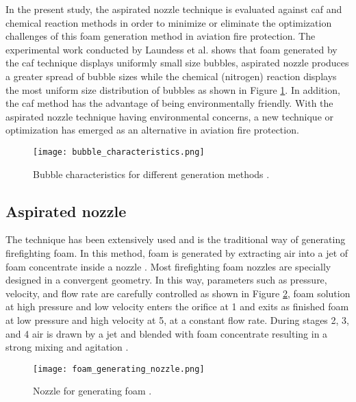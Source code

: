 In the present study, the aspirated nozzle technique is evaluated against \acrshort{caf} and chemical reaction methods in order to minimize or eliminate the optimization challenges of this foam generation method in aviation fire protection. The experimental work conducted by Laundess et al. \cite{laundess2012suppression} shows that foam generated by the \acrshort{caf} technique displays uniformly small size bubbles, aspirated nozzle produces a greater spread of bubble sizes while the chemical (nitrogen) reaction displays the most uniform size distribution of bubbles as shown in Figure \ref{ch2:figure:characteristics}. In addition, the \acrshort{caf} method has the advantage of being environmentally friendly.  With the aspirated nozzle technique having environmental concerns, a new technique or optimization has emerged as an alternative in aviation fire protection. 

\begin{figure}[H]
    \centering
    \texttt{[image: bubble\_characteristics.png]}
    \caption{Bubble characteristics for different generation methods \cite{laundess2012suppression}.}
    \label{ch2:figure:characteristics}
\end{figure}

\subsection{Aspirated nozzle}
The technique has been extensively used and is the traditional way of generating firefighting foam. In this method, foam is generated by extracting air into a jet of foam concentrate inside a nozzle \cite{xi2017experimental}. Most firefighting foam nozzles are specially designed in a convergent geometry. In this way, parameters such as pressure, velocity, and flow rate are carefully controlled as shown in Figure \ref{ch2:figure:nozzle}, foam solution at high pressure and low velocity enters the orifice at 1 and exits as finished foam at low pressure and high velocity at 5, at a constant flow rate. During stages 2, 3, and 4 air is drawn by a jet and blended with foam concentrate resulting in a strong mixing and agitation \cite{csb2016phenomenological}.

\begin{figure}[H]
    \centering
    \texttt{[image: foam\_generating\_nozzle.png]}
    \caption{Nozzle for generating foam \cite{csb2016phenomenological}.}
    \label{ch2:figure:nozzle}
\end{figure}

